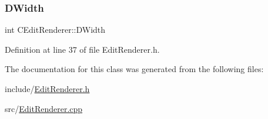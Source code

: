 \subsubsection{\texorpdfstring{D\+Width}{DWidth}}
{\footnotesize\ttfamily int C\+Edit\+Renderer\+::\+D\+Width\hspace{0.3cm}{\ttfamily [protected]}}



Definition at line 37 of file Edit\+Renderer.\+h.



The documentation for this class was generated from the following files\+:\begin{DoxyCompactItemize}
\item 
include/\hyperlink{EditRenderer_8h}{Edit\+Renderer.\+h}\item 
src/\hyperlink{EditRenderer_8cpp}{Edit\+Renderer.\+cpp}\end{DoxyCompactItemize}
